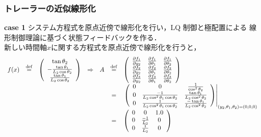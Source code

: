 \begin{frame}[t] 
\frametitle{トレーラーの近似線形化}

\noindent
{\bf case 1}
      システム方程式を原点近傍で線形化を行い，LQ 制御と極配置による
      線形制御理論に基づく状態フィードバックを作る．\\
      新しい時間軸$x$に関する方程式を原点近傍で線形化を行うと，
\begin{equation*}
 \begin{array}{lclclcl}
  f(x) &\stackrel{\rm def}{=}&
   \left(
    \begin{array}{c}
     \tan \theta_2 \\
     -\frac{\tan \theta_1}{L_2 \cos \theta_2} \\
     \frac{\tan \theta_1}{L_2 \cos \theta_2} 
    \end{array}
   \right) &\Rightarrow&
   A &\stackrel{\rm def}{=}&
   \left(
    \begin{array}{ccc}
     \frac{\partial f_1}{\partial y_2} &
      \frac{\partial f_1}{\partial \theta_1} &
      \frac{\partial f_1}{\partial \theta_2} \\
     \frac{\partial f_2}{\partial y_2} &
      \frac{\partial f_2}{\partial \theta_1} &
      \frac{\partial f_2}{\partial \theta_2} \\
     \frac{\partial f_3}{\partial y_2} &
      \frac{\partial f_3}{\partial \theta_1} &
      \frac{\partial f_3}{\partial \theta_2} 
    \end{array}
  \right) \\
  & & & & &=&
  \left. \left(
  \begin{array}{ccc}
   0 & 0 & \frac{1}{\cos ^2 \theta_2} \\
   0 & \frac{-1}{L_2\cos ^2 \theta_1 \cos \theta_2} &
    \frac{\tan \theta_1}{L_2 \cos ^2 \theta_2} \\
   0 & \frac{1}{L_2\cos ^2 \theta_1 \cos \theta_2} &
    \frac{-\tan \theta_1}{L_2 \cos ^2 \theta_2} \\
  \end{array}
  \right) \right|_{(y_2,\theta_1, \theta_2) = (0, 0, 0)} \\
  & & & & &=&
  \left(
   \begin{array}{ccc}
    0 & 0  & 1.0 \\
    0 & \frac{-1}{L_2} & 0 \\
    0 & \frac{1}{L_2}  & 0
   \end{array}
  \right) \\

\end{array}
\end{equation*}
\end{frame}
